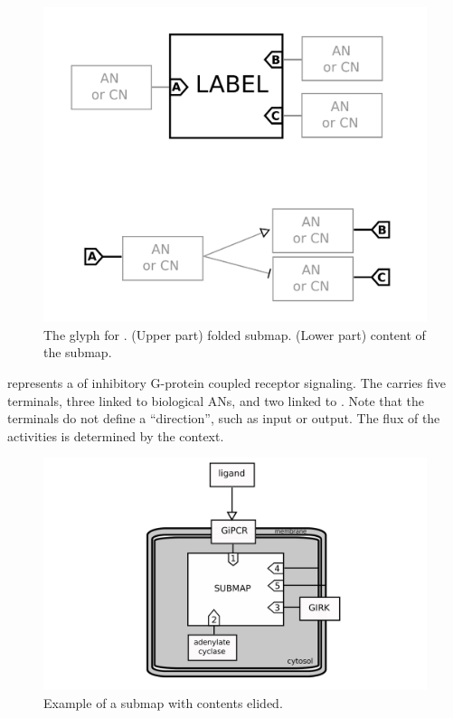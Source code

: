 \begin{figure}[H]
  \centering
  \includegraphics[scale = 0.3]{images/submap.pdf}
  \caption{The \AF glyph for . (Upper part) folded submap. (Lower part) content of the submap.}
  \label{fig:submap}
\end{figure}

 represents a  of inhibitory G-protein coupled receptor signaling. The  carries five terminals, three linked to biological ANs, and two linked to .  Note that the terminals do not define a ``direction'', such as input or output.  The flux of the activities is determined by the context.

\begin{figure}[H]
  \centering
  \includegraphics[scale = 0.5]{examples/submap-folded.pdf}
  \caption{Example of a submap with contents elided.}
  \label{fig:submap-folded}
\end{figure}

